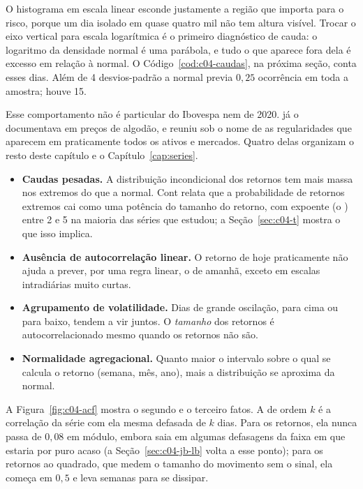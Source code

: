 
O histograma em escala linear esconde justamente a região que importa para o risco, porque um dia isolado em quase quatro mil não tem altura visível. Trocar o eixo vertical para escala logarítmica é o primeiro diagnóstico de cauda: o logaritmo da densidade normal é uma parábola, e tudo o que aparece fora dela é excesso em relação à normal. O Código~\ref{cod:c04-caudas}, na próxima seção, conta esses dias. Além de 4 desvios-padrão a normal previa $0,25$ ocorrência em toda a amostra; houve 15.

Esse comportamento não é particular do Ibovespa nem de 2020. \citet{mandelbrot1963} já o documentava em preços de algodão, e \citet{cont2001} reuniu sob o nome de  as regularidades que aparecem em praticamente todos os ativos e mercados. Quatro delas organizam o resto deste capítulo e o Capítulo~\ref{cap:series}.

\begin{itemize}
  \item \textbf{Caudas pesadas.} A distribuição incondicional dos retornos tem mais massa nos extremos do que a normal. Cont relata que a probabilidade de retornos extremos cai como uma potência do tamanho do retorno, com expoente (o ) entre 2 e 5 na maioria das séries que estudou; a Seção~\ref{sec:c04-t} mostra o que isso implica.
  \item \textbf{Ausência de autocorrelação linear.} O retorno de hoje praticamente não ajuda a prever, por uma regra linear, o de amanhã, exceto em escalas intradiárias muito curtas.
  \item \textbf{Agrupamento de volatilidade.} Dias de grande oscilação, para cima ou para baixo, tendem a vir juntos. O \emph{tamanho} dos retornos é autocorrelacionado mesmo quando os retornos não são.
  \item \textbf{Normalidade agregacional.} Quanto maior o intervalo sobre o qual se calcula o retorno (semana, mês, ano), mais a distribuição se aproxima da normal.
\end{itemize}

A Figura~\ref{fig:c04-acf} mostra o segundo e o terceiro fatos. A  de ordem $k$ é a correlação da série com ela mesma defasada de $k$ dias. Para os retornos, ela nunca passa de $0,08$ em módulo, embora saia em algumas defasagens da faixa em que estaria por puro acaso (a Seção~\ref{sec:c04-jb-lb} volta a esse ponto); para os retornos ao quadrado, que medem o tamanho do movimento sem o sinal, ela começa em $0,5$ e leva semanas para se dissipar.

